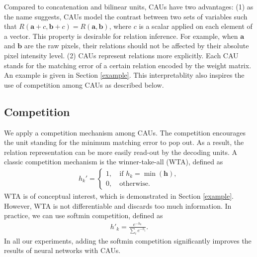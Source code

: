 \documentclass[conference]{IEEEtran}
\begin{document}
Compared to concatenation and bilinear units, CAUs have two advantages: (1) as the name suggests, CAUs model the contrast between two sets of variables such that 
$R(\mathbf{a}+c,\mathbf{b}+c) = R(\mathbf{a},\mathbf{b})$,
where $c$ is a scalar applied on each element of a vector. This property is desirable for relation inference. For example, when $\mathbf{a}$ and $\mathbf{b}$ are the raw pixels, their relations should not be affected by their absolute pixel intensity level. (2) CAUs 
represent relations more explicitly. Each CAU stands for the matching error of a certain relation encoded by the weight matrix. An example is given in Section \ref{example}. This interpretablity also inspires the use of competition among CAUs as described below.

\subsection{Competition}
We apply a competition mechanism among CAUs. The competition encourages the unit standing for the minimum matching error to pop out. As a result, the relation representation can be more easily read-out by the decoding units. 
A classic competition mechanism is the winner-take-all (WTA), defined as
\begin{align}
h_k' = 
\begin{cases}
1,\quad \text{if } h_k =\min(\mathbf{h}),   \\
0,\quad \text{otherwise.}
\end{cases}
\end{align}
WTA is of conceptual interest, which is demonstrated in Section \ref{example}. However, WTA is not differentiable and discards too much information.
In practice, we can use softmin competition, defined as 
\begin{align}{h}'_k = \frac{e^{-h_k}}{\sum_ie^{-h_i}}.
\end{align}
In all our experiments, adding the softmin competition significantly improves the results of neural networks with CAUs.
\end{document}
